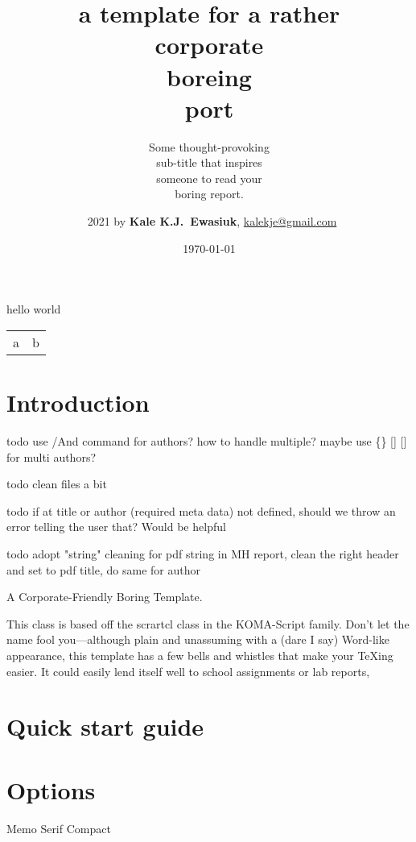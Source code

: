 \documentclass{corpboreport}
\title{a template for a rather \\[0.2ex]
corp{\smaller\smaller\normalfont orate} \\
bore{\smaller\smaller\normalfont ing} \\
\leavevmode\llap{{\smaller\smaller\normalfont re}}port \\[0.1ex]
}
\author{\textcopyright\ 2021 by {\bfseries Kale K.J.\ Ewasiuk}, \url{kalekje@gmail.com}}
\subtitle{%
		Some thought-provoking\\
		sub-title that inspires\\
		someone to read your\\
		boring report.
}
\date{\today}
\begin{document}


	\begin{LTXexample}
		hello world

		\begin{tabular}{ l l }
			a & b \\
		\end{tabular}
	\end{LTXexample}

\maketitle


\IntentionallyBlankPage



\section{Introduction}
todo use /And command for authors? how to handle multiple? maybe use \{\} [] [] for multi authors?

todo clean files a bit

todo if at title or author (required meta data) not defined, should we throw an error telling the user that? Would be helpful

todo adopt "string" cleaning for pdf string in MH report, clean the right header and set to pdf title, do same for author

A Corporate-Friendly Boring Template.

This class is based off the scrartcl class in the KOMA-Script family.
Don't let the name fool you---although plain and unassuming with a (dare I say) Word-like appearance,
this template has a few bells and whistles that make your TeXing easier.
It could easily lend itself well to school assignments or lab reports,

\section{Quick start guide}

\section{Options}
Memo
Serif
Compact
\end{document}
